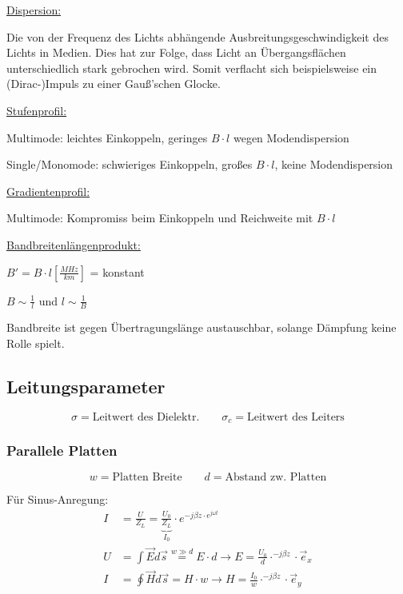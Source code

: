 \begin{description}
    \item \underline{Dispersion:}

          {\small Die von der Frequenz des Lichts abhängende
              Ausbreitungsgeschwindigkeit des Lichts in Medien. Dies hat zur Folge,
              dass Licht an Übergangsflächen unterschiedlich stark gebrochen wird.
              Somit verflacht sich beispielsweise ein (Dirac-)Impuls zu einer Gauß'schen
              Glocke.
          }
    \item \underline{Stufenprofil:}

          {\small Multimode: leichtes Einkoppeln, geringes $B\cdot l$ wegen
              Modendispersion

              Single/Monomode: schwieriges Einkoppeln, großes $B\cdot l$, keine
              Modendispersion
          }
    \item \underline{Gradientenprofil:}

          {\small Multimode: Kompromiss beim Einkoppeln und Reichweite mit $B\cdot l$}
    \item \underline{Bandbreitenlängenprodukt:}

          {\small $B' =  B\cdot l[\frac{MHz}{km}]$ = konstant

              $B \sim \frac{1}{l}$ und $l\sim \frac{1}{B}$

              Bandbreite ist gegen Übertragungslänge austauschbar, solange
              Dämpfung keine Rolle spielt.
          }
\end{description}
\subsection{Leitungsparameter}

{\small\[
	\sigma = \text{Leitwert des Dielektr.} \qquad \sigma_c = \text{Leitwert des Leiters}
	\]}

\subsubsection{Parallele Platten}
{\small\[
	w  = \text{Platten Breite} \qquad d  = \text{Abstand zw. Platten}
	\]}

Für Sinus-Anregung:
\begin{align*}
	I & = \frac{U}{Z_L} = \underbrace{\frac{U_0}{Z_L}}_{I_0}\cdot e^{-j\beta z\cdot e^{j\omega t}}                         \\
	U & = \int \vec{E} d\vec{s} \stackrel{w\gg d}{=} E\cdot d \rightarrow E = \frac{U_0}{d}\cdot^{-j\beta z}\cdot\vec{e}_x \\
	I & = \oint \vec{H} d\vec{s} =  H\cdot w \rightarrow H = \frac{I_0}{w}\cdot^{-j\beta z}\cdot\vec{e}_y                  %
\end{align*}


